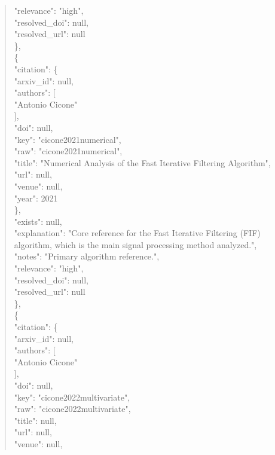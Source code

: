 \documentclass[11pt]{article}
\begin{document}
\begin{quote}
      "relevance": "high",\\
      "resolved\_doi": null,\\
      "resolved\_url": null\\
    \},\\
    \{\\
      "citation": \{\\
        "arxiv\_id": null,\\
        "authors": [\\
          "Antonio Cicone"\\
        ],\\
        "doi": null,\\
        "key": "cicone2021numerical",\\
        "raw": "cicone2021numerical",\\
        "title": "Numerical Analysis of the Fast Iterative Filtering Algorithm",\\
        "url": null,\\
        "venue": null,\\
        "year": 2021\\
      \},\\
      "exists": null,\\
      "explanation": "Core reference for the Fast Iterative Filtering (FIF) algorithm, which is the main signal processing method analyzed.",\\
      "notes": "Primary algorithm reference.",\\
      "relevance": "high",\\
      "resolved\_doi": null,\\
      "resolved\_url": null\\
    \},\\
    \{\\
      "citation": \{\\
        "arxiv\_id": null,\\
        "authors": [\\
          "Antonio Cicone"\\
        ],\\
        "doi": null,\\
        "key": "cicone2022multivariate",\\
        "raw": "cicone2022multivariate",\\
        "title": null,\\
        "url": null,\\
        "venue": null,\\

\end{quote}
\end{document}
